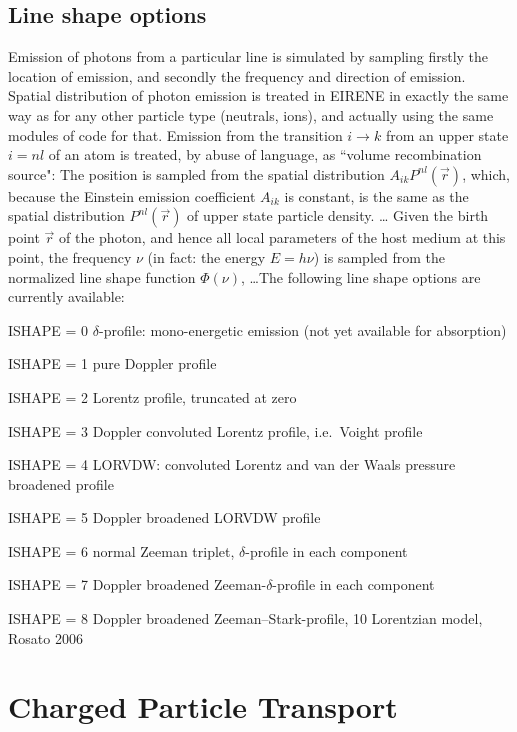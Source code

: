 \subsection{Line shape options}

Emission of photons from a particular line is simulated by sampling firstly the
location of emission, and secondly the frequency and direction of emission.
Spatial distribution of photon emission is treated in EIRENE in exactly the
same way as for any other particle type (neutrals, ions), and actually using
the same modules of code for that.
Emission from the transition $i\rightarrow k$ from an upper state $i=nl$ of an
atom is treated, by abuse  of language, as ``volume recombination source": The
position is sampled from the spatial distribution $A_{ik}P^{nl}(\vec{r})$,
which, because the Einstein emission coefficient $A_{ik}$ is constant, is the
same as the spatial distribution $P^{nl}(\vec{r})$ of upper state particle
density.
\dots
Given the birth point $\vec{r}
$ of the photon, and hence  all local parameters of the host medium at this
point, the frequency $\nu$ (in fact: the energy $E=h\nu$) is sampled from the
normalized line shape function $\Phi(\nu)$, \dots The following line shape
options are currently available:
\begin{description}
  \item{ISHAPE = 0} $\delta$-profile: mono-energetic emission (not yet available
        for absorption)
  \item{ISHAPE = 1} pure Doppler profile
  \item{ISHAPE = 2}
        Lorentz profile, truncated at zero
  \item{ISHAPE = 3} Doppler convoluted Lorentz
        profile, i.e.\ Voight profile
  \item{ISHAPE = 4} LORVDW: convoluted Lorentz and
        van der Waals pressure broadened profile
  \item{ISHAPE = 5} Doppler broadened
        LORVDW profile
  \item{ISHAPE = 6} normal Zeeman triplet, $\delta$-profile in
        each component
  \item{ISHAPE = 7} Doppler broadened Zeeman-$\delta$-profile in
        each component
  \item{ISHAPE = 8} Doppler broadened Zeeman--Stark-profile, 10
        Lorentzian model, Rosato 2006
\end{description}

\newpage 

\section{Charged Particle Transport} 

